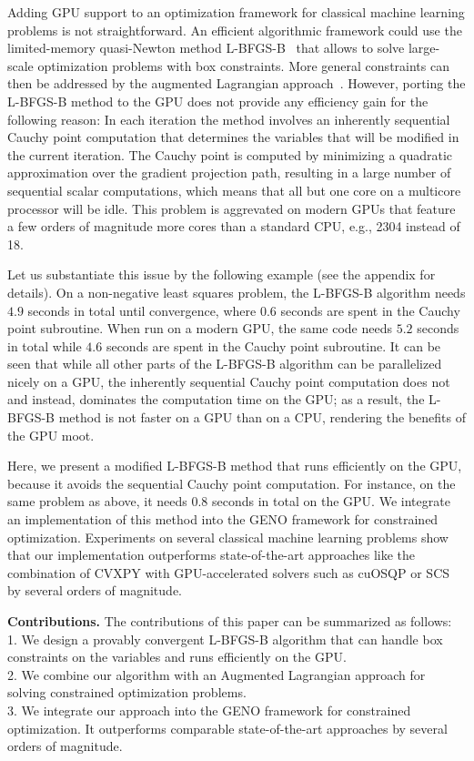 \documentclass[letterpaper]{article} %
\begin{document}
Adding GPU support to an optimization framework for classical machine learning problems is not straightforward. An efficient algorithmic framework could use the limited-memory quasi-Newton method L-BFGS-B~\cite{ByrdLNZ95} that allows to solve large-scale optimization problems with box constraints. More general constraints can then be addressed by the augmented Lagrangian approach~\cite{Hestenes69,Powell69}. However, porting the L-BFGS-B method to the GPU does not provide any efficiency gain for the following reason: In each iteration the method involves an inherently sequential Cauchy point computation that determines the variables that will be modified in the current iteration. The Cauchy point is computed by minimizing a quadratic approximation over the gradient projection path, resulting in a large number of sequential scalar computations, which means that all but one core on a multicore processor will be idle. This problem is aggrevated on modern GPUs that feature a few orders of magnitude  more cores than a standard CPU, e.g., 2304 instead of 18. 

Let us substantiate this issue by the following example (see the appendix for details). On a non-negative least squares problem, the  \mbox{L-BFGS-B} algorithm needs $4.9$ seconds in total until convergence, where $0.6$ seconds are spent in the Cauchy point subroutine. When run on a modern GPU, the same code needs $5.2$ seconds in total while $4.6$ seconds are spent in the Cauchy point subroutine. It can be seen that while all other parts of the L-BFGS-B algorithm can be parallelized nicely on a GPU, the inherently sequential Cauchy point computation does not and instead, dominates the computation time on the GPU; as a result, the \mbox{L-BFGS-B} method is not faster on a GPU than on a CPU, rendering the benefits of the GPU moot. 

Here, we present a modified \mbox{L-BFGS-B} method that runs efficiently on the GPU, because it avoids the sequential Cauchy point computation. For instance, on the same problem as above, it needs $0.8$ seconds in total on the GPU.
We integrate an implementation of this method into the GENO framework for constrained optimization. Experiments on several classical machine learning problems show that our implementation outperforms state-of-the-art approaches like the combination of CVXPY with GPU-accelerated solvers such as cuOSQP or SCS by several orders of magnitude.

\textbf{Contributions.}
The contributions of this paper can be summarized as follows:\\
1. We design a provably convergent L-BFGS-B algorithm that can handle box constraints on the variables and runs efficiently on the GPU. \\
2. We combine our algorithm with an Augmented Lagrangian approach for solving constrained optimization problems. \\
3. We integrate our approach %
into the GENO framework for constrained optimization.
It outperforms comparable state-of-the-art approaches by several orders of magnitude.
\end{document}
